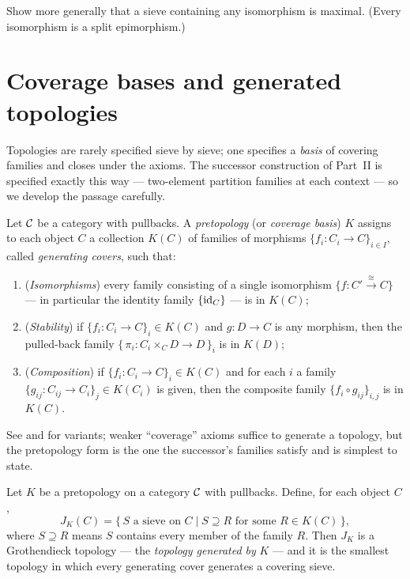 \begin{exercise}\label{ch03:exr:iso-maximal}
Show more generally that a sieve containing any isomorphism is
maximal. (Every isomorphism is a split epimorphism.)
\end{exercise}

\section{Coverage bases and generated topologies}\label{ch03:sec:bases}

Topologies are rarely specified sieve by sieve; one specifies a
\emph{basis} of covering families and closes under the axioms. The
successor construction of Part~II is specified exactly this way ---
two-element partition families at each context --- so we develop
the passage carefully.

\begin{definition}\label{ch03:def:pretopology}
Let $\mathcal{C}$ be a category with pullbacks. A \emph{pretopology} (or
\emph{coverage basis}) $K$ assigns to each object $C$ a collection
$K(C)$ of families of morphisms $\{f_i : C_i \to C\}_{i \in I}$,
called \emph{generating covers}, such that:
\begin{enumerate}
\item[(B1)] (\emph{Isomorphisms}) every family consisting of a
single isomorphism $\{f : C' \xrightarrow{\ \cong\ } C\}$ ---
in particular the identity family $\{\mathrm{id}_C\}$ --- is in $K(C)$;
\item[(B2)] (\emph{Stability}) if
$\{f_i : C_i \to C\}_i \in K(C)$ and $g : D \to C$ is any
morphism, then the pulled-back family
$\{\, \pi_i : C_i \times_C D \to D \,\}_i$ is in $K(D)$;
\item[(B3)] (\emph{Composition}) if
$\{f_i : C_i \to C\}_i \in K(C)$ and for each $i$ a family
$\{g_{ij} : C_{ij} \to C_i\}_j \in K(C_i)$ is given, then the
composite family $\{f_i \circ g_{ij}\}_{i,j}$ is in $K(C)$.
\end{enumerate}
See \cite{stacks00ZC} and \cite[Ch.~III]{maclane} for variants;
weaker ``coverage'' axioms
suffice to generate a topology, but the pretopology form is the one
the successor's families satisfy and is simplest to state.
\end{definition}

\begin{theorem}\label{ch03:thm:generated-topology}
Let $K$ be a pretopology on a category $\mathcal{C}$ with pullbacks. Define,
for each object $C$,
\[
J_K(C) = \{\, S \text{ a sieve on } C \mid S \supseteq R
\text{ for some } R \in K(C) \,\},
\]
where $S \supseteq R$ means $S$ contains every member of the family
$R$. Then $J_K$ is a Grothendieck topology --- the \emph{topology
generated by} $K$ --- and it is the smallest topology in which every
generating cover generates a covering sieve.
\end{theorem}

